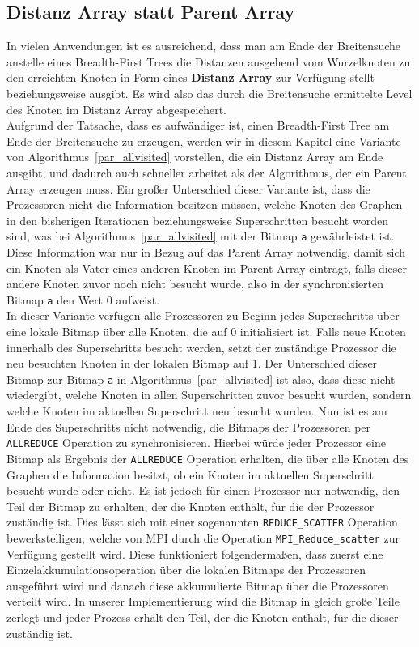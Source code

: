 \documentclass[11pt,a4paper]{article}
\begin{document}
\subsection{Distanz Array statt Parent Array}
\label{sec:distanzarray}
In vielen Anwendungen ist es ausreichend, dass man am Ende der Breitensuche anstelle eines Breadth-First Trees die Distanzen ausgehend vom Wurzelknoten zu den erreichten Knoten in Form eines \textbf{Distanz Array} zur Verfügung stellt beziehungsweise ausgibt. Es wird also das durch die Breitensuche ermittelte Level des Knoten im Distanz Array abgespeichert.\\
Aufgrund der Tatsache, dass es aufwändiger ist, einen Breadth-First Tree am Ende der Breitensuche zu erzeugen, werden wir in diesem Kapitel eine Variante von Algorithmus~\ref{par_allvisited} vorstellen, die ein Distanz Array am Ende ausgibt, und dadurch auch schneller arbeitet als der Algorithmus, der ein Parent Array erzeugen muss. Ein großer Unterschied dieser Variante ist, dass die Prozessoren nicht die Information besitzen müssen, welche Knoten des Graphen in den bisherigen Iterationen beziehungsweise Superschritten besucht worden sind, was bei Algorithmus~\ref{par_allvisited} mit der Bitmap \lstinline{a} gewährleistet ist.  Diese Information war nur in Bezug auf das Parent Array notwendig, damit sich ein Knoten als Vater eines anderen Knoten im Parent Array einträgt, falls dieser andere Knoten zuvor noch nicht besucht wurde, also in der synchronisierten Bitmap \lstinline{a} den Wert 0 aufweist.\\
In dieser Variante verfügen alle Prozessoren zu Beginn jedes Superschritts über eine lokale Bitmap über alle Knoten, die auf 0 initialisiert ist. Falls neue Knoten innerhalb des Superschritts besucht werden, setzt der zuständige Prozessor die neu besuchten Knoten in der lokalen Bitmap auf 1. Der Unterschied dieser Bitmap zur Bitmap \lstinline{a} in Algorithmus~\ref{par_allvisited} ist also, dass diese nicht wiedergibt, welche Knoten in allen Superschritten zuvor besucht wurden, sondern welche Knoten im aktuellen Superschritt neu besucht wurden. Nun ist es am Ende des Superschritts nicht notwendig, die Bitmaps der Prozessoren per \lstinline{ALLREDUCE} Operation zu synchronisieren. Hierbei würde jeder Prozessor eine Bitmap als Ergebnis der \lstinline{ALLREDUCE} Operation erhalten, die über alle Knoten des Graphen die Information besitzt, ob ein Knoten im aktuellen Superschritt besucht wurde oder nicht. Es ist jedoch für einen Prozessor nur notwendig, den Teil der Bitmap zu erhalten, der die Knoten enthält, für die der Prozessor zuständig ist. Dies lässt sich mit einer sogenannten \lstinline{REDUCE_SCATTER} Operation bewerkstelligen, welche von MPI durch die Operation \lstinline{MPI_Reduce_scatter} zur Verfügung gestellt wird. Diese funktioniert folgendermaßen, dass zuerst eine Einzelakkumulationsoperation über die lokalen Bitmaps der Prozessoren ausgeführt wird und danach diese akkumulierte Bitmap über die Prozessoren verteilt wird. In unserer Implementierung wird die Bitmap in gleich große Teile zerlegt und jeder Prozess erhält den Teil, der die Knoten enthält, für die dieser zuständig ist.\\
\end{document}
